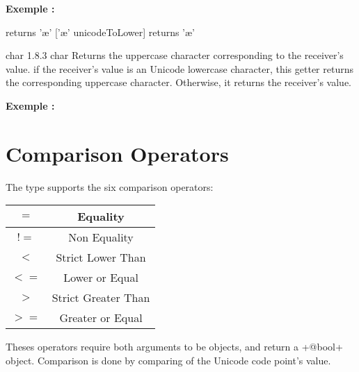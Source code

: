 \textbf{Exemple :}
\begin{galgascode}
['\AE' unicodeToLower] returns '\ae '
['\ae' unicodeToLower] returns '\ae '
\end{galgascode}




{char}
{1.8.3}
{char}
{Returns the uppercase character corresponding to the receiver's value.}
{if the receiver's value is an Unicode lowercase character, this getter returns the corresponding uppercase character. Otherwise, it returns the receiver's value.}

\textbf{Exemple :}
\begin{galgascode}
['\AE' unicodeToUpper] returns '\AE'}
['\ae' unicodeToUpper] returns '\AE'}
\end{galgascode}





\section{Comparison Operators}

The  type supports the six comparison operators:\newline

\begin{tabular}{|c|c|}
\hline
$=$ & Equality \\
\hline
$!=$ & Non Equality \\
\hline
$<$  & Strict Lower Than \\
\hline
$<=$  & Lower or Equal \\
\hline
$>$  & Strict Greater Than \\
\hline
$>=$  & Greater or Equal \\
\hline
\end{tabular}

Theses operators require both arguments to be  objects, and return a \ggs+@bool+ object. Comparison is done by comparing of the Unicode code point's value.


